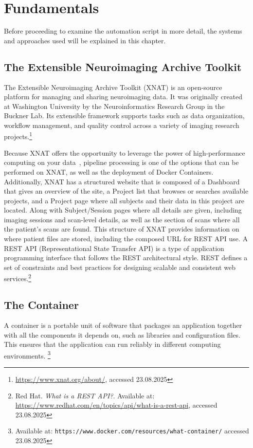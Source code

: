 
\chapter{Fundamentals}

Before proceeding to examine the automation script in more detail, the systems and approaches used will be explained in this chapter.

\section{The Extensible Neuroimaging Archive Toolkit}
The Extensible Neuroimaging Archive Toolkit (XNAT) is an open-source platform for managing and sharing neuroimaging data. It was originally created at Washington University by the Neuroinformatics Research Group in the Buckner Lab. Its extensible framework supports tasks such as data organization, workflow management, and quality control across a variety of imaging research projects.\footnote{\url{https://www.xnat.org/about/}, accessed 23.08.2025}

Because XNAT offers the opportunity to leverage the power of high-performance computing on your data~\cite{zaschke_extending_2024}, 
pipeline processing is one of the options that can be performed on XNAT, as well as the deployment of Docker Containers.
\\
Additionally, XNAT has a structured website that is composed of a Dashboard that gives an overview of the site, a Project list that browses or searches available projects, and a Project page where all subjects and their data in this project are located. Along with Subject/Session pages where all details are given, including imaging sessions and scan-level details, as well as the section of scans where all the patient’s scans are found. 
This structure of XNAT provides information on where patient files are stored, including the composed URL for REST API use. A REST API (Representational State Transfer API) is a type of application programming interface that follows the REST architectural style. REST defines a set of constraints and best practices for designing scalable and consistent web services.\footnote{Red Hat. \textit{What is a REST API?}. Available at: \url{https://www.redhat.com/en/topics/api/what-is-a-rest-api}, accessed 23.08.2025}

\section{The Container} 
A container is a portable unit of software that packages an application together with all the components it depends on, such as libraries and configuration files. This ensures that the application can run reliably in different computing environments. \footnote{Available at: \texttt{https://www.docker.com/resources/what-container/} accessed 23.08.2025}

